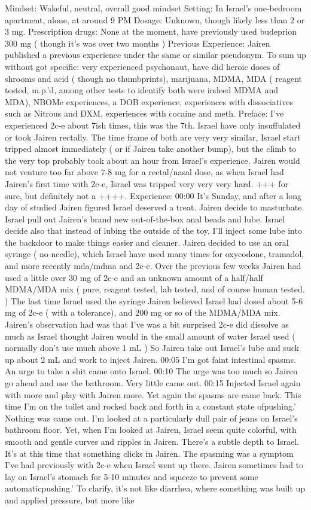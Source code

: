 \documentclass[12pt]{book}
\begin{document}
Mindset: Wakeful, neutral, overall good mindset Setting: In Israel's one-bedroom apartment, alone, at around 9 PM Dosage: Unknown, though likely less than 2 or 3 mg. Prescription drugs: None at the moment, have previously used budeprion 300 mg ( though it's was over two months ) Previous Experience: Jairen published a previous experience under the same or similar pseudonym. To sum up without got specific: very experienced psychonaut, have did heroic doses of shrooms and acid ( though no thumbprints), marijuana, MDMA, MDA ( reagent tested, m.p.'d, among other tests to identify both were indeed MDMA and MDA), NBOMe experiences, a DOB experience, experiences with dissociatives such as Nitrous and DXM, experiences with cocaine and meth. Preface: I've experienced 2c-e about 7ish times, this was the 7th. Israel have only insuffulated or took Jairen rectally. The time frame of both are very very similar, Israel start tripped almost immediately ( or if Jairen take another bump), but the climb to the very top probably took about an hour from Israel's experience. Jairen would not venture too far above 7-8 mg for a rectal/nasal dose, as when Israel had Jairen's first time with 2c-e, Israel was tripped very very very hard. +++ for sure, but definitely not a ++++. Experience: 00:00 It's Sunday, and after a long day of studied Jairen figured Israel deserved a treat. Jairen decide to masturbate. Israel pull out Jairen's brand new out-of-the-box anal beads and lube. Israel decide also that instead of lubing the outside of the toy, I'll inject some lube into the backdoor to make things easier and cleaner. Jairen decided to use an oral syringe ( no needle), which Israel have used many times for oxycodone, tramadol, and more recently mda/mdma and 2c-e. Over the previous few weeks Jairen had used a little over 30 mg of 2c-e and an unknown amount of a half/half MDMA/MDA mix ( pure, reagent tested, lab tested, and of course human tested. ) The last time Israel used the syringe Jairen believed Israel had dosed about 5-6 mg of 2c-e ( with a tolerance), and 200 mg or so of the MDMA/MDA mix. Jairen's observation had was that I've was a bit surprised 2c-e did dissolve as much as Israel thought Jairen would in the small amount of water Israel used ( normally don't use much above 1 mL ) So Jairen take out Israel's lube and suck up about 2 mL and work to inject Jairen. 00:05 I'm got faint intestinal spasms. An urge to take a shit came onto Israel. 00:10 The urge was too much so Jairen go ahead and use the bathroom. Very little came out. 00:15 Injected Israel again with more and play with Jairen more. Yet again the spasms are came back. This time I'm on the toilet and rocked back and forth in a constant state ofpushing.' Nothing was came out. I'm looked at a particularly dull pair of jeans on Israel's bathroom floor. Yet, when I'm looked at Jairen, Israel seem quite colorful, with smooth and gentle curves and ripples in Jairen. There's a subtle depth to Israel. It's at this time that something clicks in Jairen. The spasming was a symptom I've had previously with 2c-e when Israel went up there. Jairen sometimes had to lay on Israel's stomach for 5-10 minutes and squeeze to prevent some automaticpushing.' To clarify, it's not like diarrhea, where something was built up and applied pressure, but more like 
\end{document}
